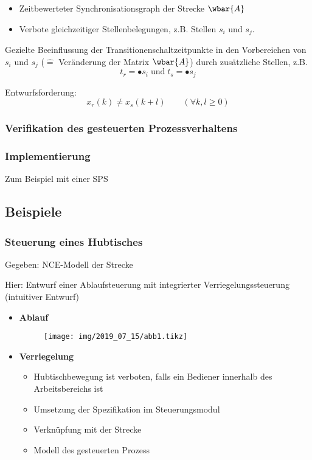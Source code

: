 \begin{enumerate}
	\begin{itemize}
		\item Zeitbewerteter Synchronisationsgraph der Strecke $\wbar{A}$
		\item Verbote gleichzeitiger Stellenbelegungen, z.B. Stellen $s_i$ und $s_j$.
	\end{itemize}
	
	Gezielte Beeinflussung der Transitionenschaltzeitpunkte in den Vorbereichen von $s_i$ und $s_j$ ($\hat{=}$ Veränderung der Matrix $\wbar{A}$) durch zusätzliche Stellen, z.B.
	\begin{equation}
		t_r = \bullet s_i \; \text{und} \; t_s = \bullet s_j
	\end{equation}
	
	Entwurfsforderung:
	\begin{equation}
		x_r(k) \neq x_s(k+l) \qquad (\forall k,l \ge 0)
	\end{equation}
\end{enumerate}

\subsubsection{Verifikation des gesteuerten Prozessverhaltens}

\subsubsection{Implementierung}
Zum Beispiel mit einer SPS 

\subsection{Beispiele}
\subsubsection{Steuerung eines Hubtisches}
Gegeben: NCE-Modell der Strecke 

Hier: Entwurf einer Ablaufsteuerung mit integrierter Verriegelungssteuerung (intuitiver Entwurf)

\begin{itemize}
	\item \textbf{Ablauf}
	\begin{figure}[H]
		\centering
		\texttt{[image: img/2019\_07\_15/abb1.tikz]}
	\end{figure}
	\item \textbf{Verriegelung}
	\begin{itemize}
		\item Hubtischbewegung ist verboten, falls ein Bediener innerhalb des Arbeitsbereichs ist
		\item Umsetzung der Spezifikation im Steuerungsmodul
		\item Verknüpfung mit der Strecke 
		\item Modell des gesteuerten Prozess 
	\end{itemize}
\end{itemize}




